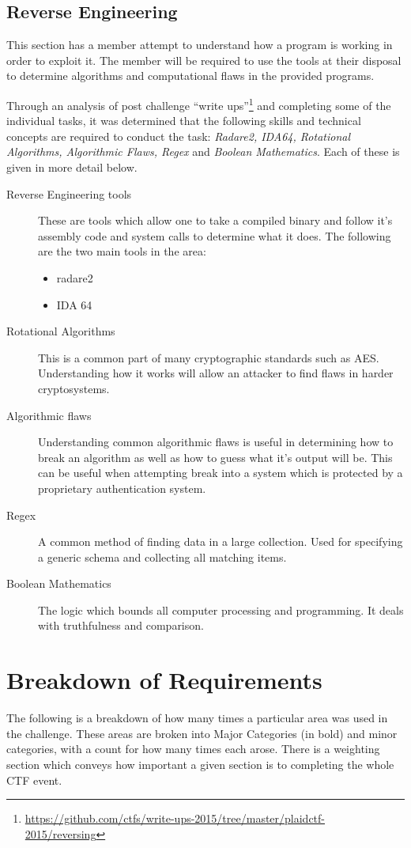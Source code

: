 \documentclass[a4paper,11pt]{report}
\begin{document}
		\subsection{Reverse Engineering}
			This section has a member attempt to understand how a program is working in order to exploit it. 
			The member will be required to use the tools at their disposal to determine algorithms and computational flaws in the provided programs. 

			Through an analysis of post challenge ``write ups''\footnote{\url{https://github.com/ctfs/write-ups-2015/tree/master/plaidctf-2015/reversing}}
			and completing some of the individual tasks, 
			it was determined that the following skills and technical concepts are required to conduct the task: 
			\textit{Radare2, IDA64, Rotational Algorithms, Algorithmic Flaws, Regex} and \textit{Boolean Mathematics}.
			Each of these is given in more detail below. 
			\begin{description}
				\item[Reverse Engineering tools] 
					These are tools which allow one to take a compiled binary and follow it's assembly code and system calls to determine what it does. 
					The following are the two main tools in the area:
					\begin{itemize}
						\item radare2
						\item IDA 64
					\end{itemize}
				\item[Rotational Algorithms]
					This is a common part of many cryptographic standards such as AES. 
					Understanding how it works will allow an attacker to find flaws in harder cryptosystems.
				\item[Algorithmic flaws] 
					Understanding common algorithmic flaws is useful in determining how to break an algorithm as well as how to guess what it's output will be. 
					This can be useful when attempting break into a system which is protected by a proprietary authentication system. 
				\item[Regex]
					A common method of finding data in a large collection. 
					Used for specifying a generic schema and collecting all matching items. 
				\item[Boolean Mathematics] 
					The logic which bounds all computer processing and programming. 
					It deals with truthfulness and comparison. 
			\end{description}
	
	\section{Breakdown of Requirements}
	 	The following is a breakdown of how many times a particular area was used in the challenge. 
		These areas are broken into Major Categories (in bold) and minor categories, with a count for how many times each arose. 
		There is a weighting section which conveys how important a given section is to completing the whole CTF event. 
\end{document}
